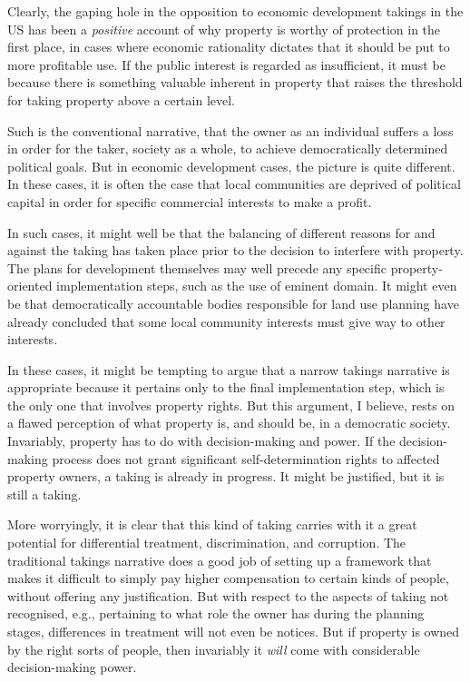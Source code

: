{Clearly, the gaping hole in the opposition to economic development takings in the US has been a {\it positive} account of why property is worthy of protection in the first place, in cases where economic rationality dictates that it should be put to more profitable use. If the public interest is regarded as insufficient, it must be because there is something valuable inherent in property that raises the threshold for taking property above a certain level.

Such is the conventional narrative, that the owner as an individual suffers a loss in order for the taker, society as a whole, to achieve democratically determined political goals. But in economic development cases, the picture is quite different. In these cases, it is often the case that local communities are deprived of political capital in order for specific commercial interests to make a profit. 

In such cases, it might well be that the balancing of different reasons for and against the taking has taken place prior to the decision to interfere with property. The plans for development themselves may well precede any specific property-oriented implementation steps, such as the use of eminent domain. It might even be that democratically accountable bodies responsible for land use planning have already concluded that some local community interests must give way to other interests.

In these cases, it might be tempting to argue that a narrow takings narrative is appropriate because it pertains only to the final implementation step, which is the only one that involves property rights. But this argument, I believe, rests on a flawed perception of what property is, and should be, in a democratic society. Invariably, property has to do with decision-making and power. If the decision-making process does not grant significant self-determination rights to affected property owners, a taking is already in progress. It might be justified, but it is still a taking. 

More worryingly, it is clear that this kind of taking carries with it a great potential for differential treatment, discrimination, and corruption. The traditional takings narrative does a good job of setting up a framework that makes it difficult to simply pay higher compensation to certain kinds of people, without offering any justification. But with respect to the aspects of taking not recognised, e.g., pertaining to what role the owner has during the planning stages, differences in treatment will not even be notices. But if property is owned by the right sorts of people, then invariably it {\it will} come with considerable decision-making power. 

}
